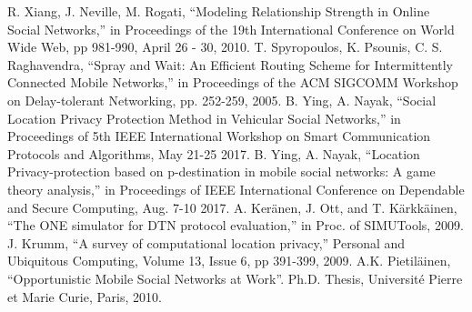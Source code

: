 \documentclass[conference]{IEEEtran}
\begin{document}
\begin{thebibliography}{00}
 R. Xiang, J. Neville, M. Rogati, ``Modeling Relationship Strength in Online Social Networks,'' in Proceedings of the 19th International Conference on World Wide Web, pp 981-990, April 26 - 30, 2010.
 T. Spyropoulos, K. Psounis, C. S. Raghavendra, ``Spray and Wait: An Efficient Routing Scheme for Intermittently Connected Mobile Networks,'' in Proceedings of the ACM SIGCOMM Workshop on Delay-tolerant Networking, pp. 252-259, 2005.
 B. Ying, A. Nayak, ``Social Location Privacy Protection Method in Vehicular Social Networks,'' in Proceedings of 5th IEEE International Workshop on Smart Communication Protocols and Algorithms, May 21-25 2017.
 B. Ying, A. Nayak, ``Location Privacy-protection based on p-destination in mobile social networks: A game theory analysis,'' in Proceedings of IEEE International Conference on Dependable and Secure Computing, Aug. 7-10 2017.
 A. Keränen, J. Ott, and T. Kärkkäinen, ``The ONE simulator for DTN protocol evaluation,'' in Proc. of SIMUTools, 2009.
 J. Krumm, ``A survey of computational location privacy,'' Personal and Ubiquitous Computing, Volume 13, Issue 6, pp 391-399, 2009.
 A.K. Pietiläinen, ``Opportunistic Mobile Social Networks at Work''. Ph.D. Thesis, Université Pierre et Marie Curie, Paris, 2010.
\end{thebibliography}
\end{document}
